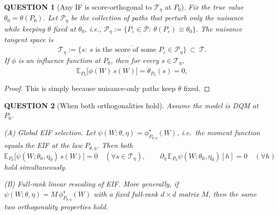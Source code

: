 \documentclass[12pt]{article}
\renewcommand{\(}{\left(}%
\renewcommand{\)}{\right)}%
\renewcommand{\[}{\left[}%
\renewcommand{\]}{\right]}%
\newtheorem{question}{QUESTION}[section]}
\newtheorem{proof}{Proof.}}
\begin{document}
\begin{question}[Any IF is score-orthogonal to $\mathcal T_\eta$ at $P_0$]
  Fix the true value $\theta_0=\theta(P_0)$. Let $\mathcal P_\eta$ be the collection of paths that perturb only the nuisance while keeping $\theta$ fixed at $\theta_0$, i.e., $\mathcal P_\eta:=\{P_\varepsilon\in\mathcal P:\ \theta(P_\varepsilon)\equiv \theta_0\}$. 
The \emph{nuisance tangent space} is
\begin{equation*}
\mathcal T_\eta:=\overline{\{s:\ s \text{ is the score of some }P_\varepsilon\in\mathcal P_\eta\}}\ \subset\ \mathcal T.
\end{equation*}
   If $\phi$ is an influence function at $P_0$, then for every $s\in\mathcal T_\eta$,
\begin{equation*}
\mathbb E_{P_0}\big[\phi(W)\,s(W)\big]=\dot\theta_{P_0}(s)=0,
\end{equation*}
\end{question}
\begin{proof}
    This is simply because nuisance-only paths keep $\theta$ fixed. 
\end{proof}

\begin{question}[When both orthogonalities hold]
    Assume the model is DQM at $P_0$.

\noindent \emph{(A) Global EIF selection.}
Let $\psi(W;\theta,\eta)=\phi^\star_{P_{\theta,\eta}}(W)$, i.e.\ the moment function equals the EIF at the law $P_{\theta,\eta}$. Then both
\begin{equation*}
\mathbb E_{P_0}\!\big[\psi(W;\theta_0,\eta_0)\,s(W)\big]=0\quad(\forall s\in\mathcal T_\eta),
\qquad
\partial_\eta\,\mathbb E_{P_0}\psi(W;\theta_0,\eta_0)[h]=0\quad(\forall h)
\end{equation*}
hold simultaneously.

\noindent \emph{(B) Full-rank linear rescaling of EIF.}
More generally, if $\psi(W;\theta,\eta)=M\,\phi^\star_{P_{\theta,\eta}}(W)$ with a fixed full-rank $d\times d$ matrix $M$, then the same two orthogonality properties hold.
\end{question}
\end{document}
